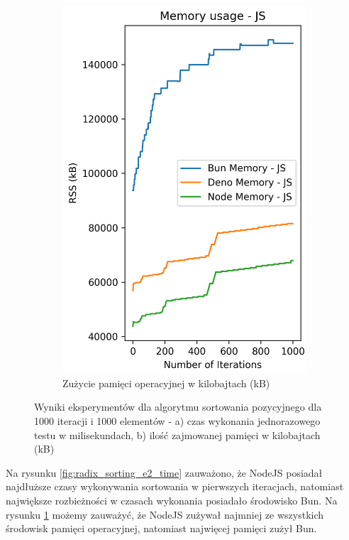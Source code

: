 \begin{figure}[H]
\begin{subfigure}[b]{0.42\textwidth}
  \end{subfigure}
  \begin{subfigure}[b]{0.42\textwidth}
    \centering
    \includegraphics[width=\textwidth]{Figures/sorting/sorting_radix_1000_1000_js_memory.png}
    \caption{Zużycie pamięci operacyjnej w kilobajtach (kB)}
    \label{fig:radix_sorting_e2_memory}
  \end{subfigure}
  \caption{Wyniki eksperymentów dla algorytmu sortowania pozycyjnego dla 1000 iteracji i 1000 elementów - a) czas wykonania jednorazowego testu w milisekundach, b) ilość zajmowanej pamięci w kilobajtach (kB)}
  \label{fig:radix_sorting_e2}
\end{figure}

Na rysunku \ref{fig:radix_sorting_e2_time} zauważono, że NodeJS posiadał najdłuższe czasy wykonywania sortowania w pierwszych iteracjach, natomiast największe rozbieżności w czasach wykonania posiadało środowisko Bun. Na rysunku \ref{fig:radix_sorting_e2_memory} możemy zauważyć, że NodeJS zużywał najmniej ze wszystkich środowisk pamięci operacyjnej, natomiast najwięcej pamięci zużył Bun.

